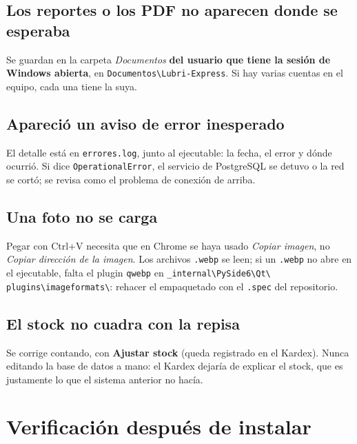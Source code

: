 \documentclass[11pt,a4paper]{article}
\begin{document}
\subsection*{Los reportes o los PDF no aparecen donde se esperaba}
Se guardan en la carpeta \emph{Documentos} \textbf{del usuario que tiene la
sesión de Windows abierta}, en \texttt{Documentos\textbackslash Lubri-Express}.
Si hay varias cuentas en el equipo, cada una tiene la suya.

\subsection*{Apareció un aviso de error inesperado}
El detalle está en \texttt{errores.log}, junto al ejecutable: la fecha, el error y
dónde ocurrió. Si dice \texttt{OperationalError}, el servicio de PostgreSQL se
detuvo o la red se cortó; se revisa como el problema de conexión de arriba.

\subsection*{Una foto no se carga}
Pegar con Ctrl+V necesita que en Chrome se haya usado \emph{Copiar imagen}, no
\emph{Copiar dirección de la imagen}. Los archivos \texttt{.webp} se leen; si un
\texttt{.webp} no abre en el ejecutable, falta el plugin \texttt{qwebp} en
\texttt{\_internal\textbackslash PySide6\textbackslash Qt\textbackslash
plugins\textbackslash imageformats\textbackslash}: rehacer el empaquetado con el
\texttt{.spec} del repositorio.

\subsection*{El stock no cuadra con la repisa}
Se corrige contando, con \textbf{Ajustar stock} (queda registrado en el Kardex).
Nunca editando la base de datos a mano: el Kardex dejaría de explicar el stock,
que es justamente lo que el sistema anterior no hacía.

\section{Verificación después de instalar}
\end{document}
